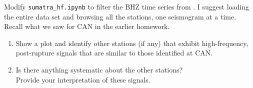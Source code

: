 
Modify \verb+sumatra_hf.ipynb+ to filter the BHZ time series from . 
I suggest loading the entire data set and browsing all the stations, one seismogram at a time.
Recall what we saw for CAN in the earlier homework.
%
\begin{enumerate}
\item Show a plot and identify other stations (if any) that exhibit high-frequency, post-rupture signals that are similar to those identified at CAN.
\item Is there anything systematic about the other stations? \\
Provide your interpretation of these signals.
\end{enumerate}
